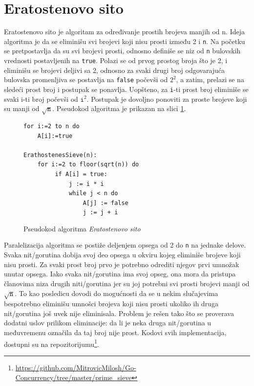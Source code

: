 \documentclass[12pt,oneside]{memoir}
\begin{document}
\section{Eratostenovo sito} \label{erathost}
Eratostenovo sito je algoritam za određivanje prostih brojeva manjih od n. Ideja algoritma je da se eliminišu svi brojevi koji nisu prosti između 2 i \texttt{n}. Na početku se pretpostavlja da su svi brojevi prosti, odnosno definiše se niz od \texttt{n} bulovskih vrednosti postavljenih na \texttt{true}. Polazi se od prvog prostog broja što je 2, i eliminišu se brojevi deljivi sa 2, odnosno za svaki drugi broj odgovarajuća bulovska promenljiva se postavlja na \texttt{false} počevši od $2^{2}$, a zatim, prelazi se na sledeći prost broj i postupak se ponavlja. Uopšteno, za \texttt{i}-ti prost broj eliminiše se svaki i-ti broj počevši od  $\texttt{i}^{2}$. Postupak je dovoljno ponoviti za proste brojeve koji su manji od $\sqrt{\texttt{n}}$. Pseudokod algoritma je prikazan na slici \ref{fig:prime_pseudo}.

\begin{figure}
\begin{center}

\begin{Verbatim}[fontsize=\small]
for i:=2 to n do
    A[i]:=true

ErathostenesSieve(n):
    for i:=2 to floor(sqrt(n)) do 
         if A[i] = true:
             j := i * i
             while j < n do
                 A[j] := false 
                 j := j + i
\end{Verbatim}

\caption{Pseudokod algoritma \textit{Eratostenovo sito}}
\label{fig:prime_pseudo}
\end{center}
\end{figure}

Paralelizacija algoritma se postiže deljenjem opsega od 2 do \texttt{n} na jednake delove. Svaka nit/gorutina dobija svoj deo opsega u okviru kojeg eliminiše brojeve koji nisu prosti. Za svaki prost broj prvo je potrebno odrediti njegov prvi umnožak unutar opsega. Iako svaka nit/gorutina ima svoj opseg, ona mora da pristupa članovima niza drugih niti/gorutina jer su joj potrebni svi prosti brojevi manji od $\sqrt{\texttt{n}}$. To kao posledicu dovodi do mogućnosti da se u nekim slučajevima bespotrebno eliminišu umnošci brojeva koji nisu prosti ukoliko ih druga nit/gorutina još uvek nije eliminisala. Problem je rešen tako što se proverava dodatni uslov prilikom eliminacije: da li je neka druga nit/gorutina u međuvremenu označila da taj broj nije prost. Kodovi svih implementacija, dostupni su na repozitorijumu\footnote{\url{https://github.com/MitrovicMilosh/Go-Concurrency/tree/master/prime_sieve}}.
\end{document}
